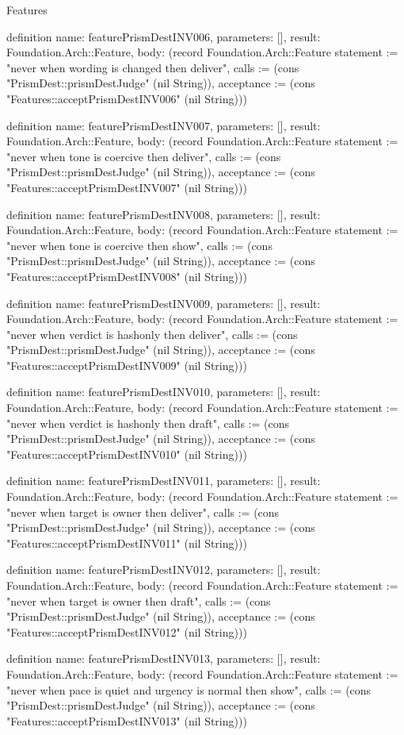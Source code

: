 \begin{lexlean}{Features}
\begin{semanticmodule}
definition{
  name: featurePrismDestINV006,
  parameters: [],
  result: Foundation.Arch::Feature,
  body: (record Foundation.Arch::Feature {statement := "never when wording is changed then deliver", calls := (cons "PrismDest::prismDestJudge" (nil String)), acceptance := (cons "Features::acceptPrismDestINV006" (nil String))})
}

definition{
  name: featurePrismDestINV007,
  parameters: [],
  result: Foundation.Arch::Feature,
  body: (record Foundation.Arch::Feature {statement := "never when tone is coercive then deliver", calls := (cons "PrismDest::prismDestJudge" (nil String)), acceptance := (cons "Features::acceptPrismDestINV007" (nil String))})
}

definition{
  name: featurePrismDestINV008,
  parameters: [],
  result: Foundation.Arch::Feature,
  body: (record Foundation.Arch::Feature {statement := "never when tone is coercive then show", calls := (cons "PrismDest::prismDestJudge" (nil String)), acceptance := (cons "Features::acceptPrismDestINV008" (nil String))})
}

definition{
  name: featurePrismDestINV009,
  parameters: [],
  result: Foundation.Arch::Feature,
  body: (record Foundation.Arch::Feature {statement := "never when verdict is hashonly then deliver", calls := (cons "PrismDest::prismDestJudge" (nil String)), acceptance := (cons "Features::acceptPrismDestINV009" (nil String))})
}

definition{
  name: featurePrismDestINV010,
  parameters: [],
  result: Foundation.Arch::Feature,
  body: (record Foundation.Arch::Feature {statement := "never when verdict is hashonly then draft", calls := (cons "PrismDest::prismDestJudge" (nil String)), acceptance := (cons "Features::acceptPrismDestINV010" (nil String))})
}

definition{
  name: featurePrismDestINV011,
  parameters: [],
  result: Foundation.Arch::Feature,
  body: (record Foundation.Arch::Feature {statement := "never when target is owner then deliver", calls := (cons "PrismDest::prismDestJudge" (nil String)), acceptance := (cons "Features::acceptPrismDestINV011" (nil String))})
}

definition{
  name: featurePrismDestINV012,
  parameters: [],
  result: Foundation.Arch::Feature,
  body: (record Foundation.Arch::Feature {statement := "never when target is owner then draft", calls := (cons "PrismDest::prismDestJudge" (nil String)), acceptance := (cons "Features::acceptPrismDestINV012" (nil String))})
}

definition{
  name: featurePrismDestINV013,
  parameters: [],
  result: Foundation.Arch::Feature,
  body: (record Foundation.Arch::Feature {statement := "never when pace is quiet and urgency is normal then show", calls := (cons "PrismDest::prismDestJudge" (nil String)), acceptance := (cons "Features::acceptPrismDestINV013" (nil String))})
}


\end{semanticmodule}
\end{lexlean}
